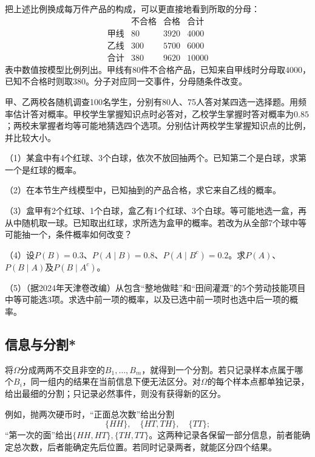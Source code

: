 把上述比例换成每万件产品的构成，可以更直接地看到所取的分母：
\[
\begin{array}{c|rr|r}
 &\text{不合格}&\text{合格}&\text{合计}\\\hline
 \text{甲线}&80&3920&4000\\
 \text{乙线}&300&5700&6000\\\hline
 \text{合计}&380&9620&10000
\end{array}
\]
表中数值按模型比例列出。甲线有80件不合格产品，已知来自甲线时分母取4000，已知不合格时则取380。分子对应同一交事件，分母随条件改变。

\begin{example}[据2025年北京卷改编]
甲、乙两校各随机调查100名学生，分别有80人、75人答对某四选一选择题。用频率估计答对概率。甲校学生掌握知识点时必答对，乙校学生掌握时答对概率为\(0.85\)；两校未掌握者均等可能地猜选四个选项。分别估计两校学生掌握知识点的比例，并比较大小。
\end{example}

\begin{exercise}
\mbox{}\par\nobreak

（1）某盒中有4个红球、3个白球，依次不放回抽两个。已知第二个是白球，求第一个是红球的概率。

（2）在本节生产线模型中，已知抽到的产品合格，求它来自乙线的概率。

（3）盒甲有2个红球、1个白球，盒乙有1个红球、3个白球。等可能地选一盒，再从中随机取一球。已知取出红球，求所选为盒甲的概率。若改为从全部7个球中等可能抽一个，条件概率如何改变？

（4）设\(P(B)=0.3\)、\(P(A\mid B)=0.8\)、\(P(A\mid B^c)=0.2\)。求\(P(A)\)、\(P(B\mid A)\)及\(P(B\mid A^c)\)。

（5）（据2024年天津卷改编）从包含“整地做畦”和“田间灌溉”的5个劳动技能项目中等可能选3项。求选中前一项的概率，以及已选中前一项时也选中后一项的概率。
\end{exercise}

\FloatBarrier
\newpage
\subsection{信息与分割*}

将\(\Omega\)分成两两不交且非空的\(B_1,\ldots,B_m\)，就得到一个{\heiti 分割}。若只记录样本点属于哪个\(B_i\)，同一组内的结果在当前信息下便无法区分。对\(\Omega\)的每个样本点都单独记录，给出最细的分割；只记录必然事件，则没有获得新的区分。

例如，抛两次硬币时，“正面总次数”给出分割
\[
 \{HH\},\quad\{HT,TH\},\quad\{TT\};
\]
“第一次的面”给出\(\{HH,HT\},\{TH,TT\}\)。这两种记录各保留一部分信息，前者能确定总次数，后者能确定先后位置。若同时记录两者，就能区分四个结果。

